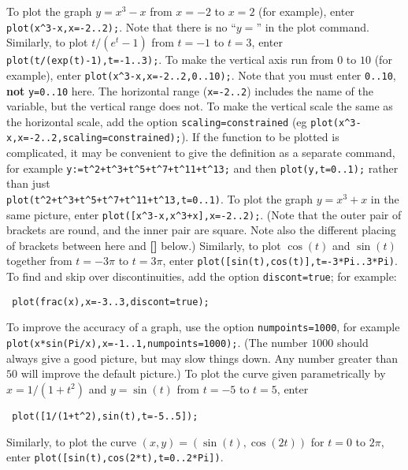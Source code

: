 \documentclass{amsart}
\newcommand{\seenote}[1]{\textbf{[#1]}}
\begin{document}
\begin{itemize}
%
  To plot the graph $y=x^3-x$ from $x=-2$ to $x=2$ (for
  example), enter \verb~plot(x^3-x,x=-2..2);~.  Note that
  there is no ``$y=$'' in the plot command.  Similarly, to
  plot $t/(e^t-1)$ from $t=-1$ to $t=3$, enter
  \verb~plot(t/(exp(t)-1),t=-1..3);~. 
%
  To make the vertical axis run from $0$ to $10$ (for
  example), enter \verb~plot(x^3-x,x=-2..2,0..10);~.  Note
  that you must enter \verb~0..10~, \textbf{not}
  \verb~y=0..10~ here.  The horizontal range
  (\verb~x=-2..2~) includes the name of the variable, but
  the vertical range does not. 
%
  To make the vertical scale the same as the horizontal
  scale, add the option \verb~scaling=constrained~ (eg
  \verb~plot(x^3-x,x=-2..2,scaling=constrained);~). 
%
  If the function to be plotted is
  complicated, it may be convenient to give the definition
  as a separate command, for example
  \verb~y:=t^2+t^3+t^5+t^7+t^11+t^13;~ and then
  \verb~plot(y,t=0..1);~ rather than just\\
  \verb~plot(t^2+t^3+t^5+t^7+t^11+t^13,t=0..1)~. 
%
  To plot the graph $y=x^3+x$ in the same picture, enter
  \verb~plot([x^3-x,x^3+x],x=-2..2);~.  (Note that the outer
  pair of brackets are round, and the inner pair are
  square.  Note also the different placing of brackets
  between here and \seenote{\NOTEparametric} below.)  Similarly,
  to plot $\cos(t)$ and $\sin(t)$ 
  together from $t=-3\pi$ to $t=3\pi$, enter
  \verb~plot([sin(t),cos(t)],t=-3*Pi..3*Pi)~. 
%
  To find and skip over discontinuities, add the option
  \verb~discont=true~; for example:
\begin{verbatim}
 plot(frac(x),x=-3..3,discont=true);
\end{verbatim}
%
  To improve the accuracy of a graph, use the option
  \verb~numpoints=1000~, for example\\
  \verb~plot(x*sin(Pi/x),x=-1..1,numpoints=1000);~.  (The
  number $1000$ should always give a good picture, but may
  slow things down.  Any number greater than $50$ will
  improve the default picture.)  
%
  To plot the curve given parametrically by
  $x=1/(1+t^2)$ and $y=\sin(t)$ from $t=-5$ to $t=5$, enter
\begin{verbatim}
 plot([1/(1+t^2),sin(t),t=-5..5]);
\end{verbatim}
  Similarly, to plot the curve $(x,y)=(\sin(t),\cos(2t))$
  for $t=0$ to $2\pi$, enter
  \verb~plot([sin(t),cos(2*t),t=0..2*Pi])~. 

\end{itemize}
\end{document}
